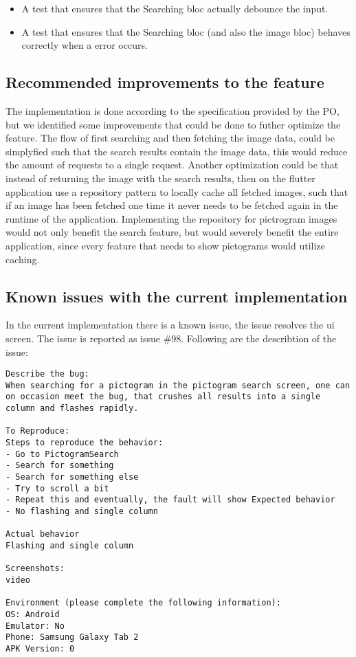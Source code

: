 \begin{itemize}
  \item A test that ensures that the Searching \gls{bloc} actually debounce the input.
  \item A test that ensures that the Searching \gls{bloc} (and also the image \gls{bloc}) behaves correctly when a error occurs.
\end{itemize}

\subsection{Recommended improvements to the feature}
The implementation is done according to the specification provided by the \gls{PO}, but we identified some improvements that could be done to futher optimize the feature. The flow of first searching and then fetching the image data, could be simplyfied such that the search results contain the image data, this would reduce the amount of requests to a single request. Another optimization could be that instead of returning the image with the search results, then on the flutter application use a repository pattern to locally cache all fetched images, such that if an image has been fetched one time it never needs to be fetched again in the runtime of the application. Implementing the repository for pictrogram images would not only benefit the search feature, but would severely benefit the entire application, since every feature that needs to show pictograms would utilize caching.

\subsection{Known issues with the current implementation}
In the current implementation there is a known issue, the issue resolves the \gls{ui} screen. The issue is reported as issue \#98. Following are the describtion of the issue:
\begin{lstlisting}
Describe the bug:
When searching for a pictogram in the pictogram search screen, one can on occasion meet the bug, that crushes all results into a single column and flashes rapidly.

To Reproduce:
Steps to reproduce the behavior:
- Go to PictogramSearch
- Search for something
- Search for something else
- Try to scroll a bit
- Repeat this and eventually, the fault will show Expected behavior
- No flashing and single column

Actual behavior
Flashing and single column

Screenshots:
video

Environment (please complete the following information):
OS: Android
Emulator: No
Phone: Samsung Galaxy Tab 2
APK Version: 0
\end{lstlisting}